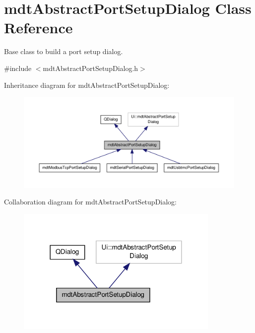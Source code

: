 \hypertarget{classmdt_abstract_port_setup_dialog}{\section{mdt\-Abstract\-Port\-Setup\-Dialog Class Reference}
\label{classmdt_abstract_port_setup_dialog}
}


Base class to build a port setup dialog.  




{\ttfamily \#include $<$mdt\-Abstract\-Port\-Setup\-Dialog.\-h$>$}



Inheritance diagram for mdt\-Abstract\-Port\-Setup\-Dialog\-:\nopagebreak
\begin{figure}[H]
\begin{center}
\leavevmode
\includegraphics[width=350pt]{classmdt_abstract_port_setup_dialog__inherit__graph}
\end{center}
\end{figure}


Collaboration diagram for mdt\-Abstract\-Port\-Setup\-Dialog\-:\nopagebreak
\begin{figure}[H]
\begin{center}
\leavevmode
\includegraphics[width=278pt]{classmdt_abstract_port_setup_dialog__coll__graph}
\end{center}
\end{figure}
